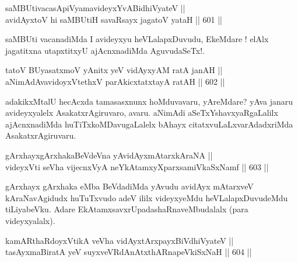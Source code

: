 
\begin{shl}
saMBUtivacasA\s piVyamavideyxYvABidhiVyateV ||  \\
avidAyxtoV hi saMBUtiH savaRsayx jagatoV yataH \hfill || 601 ||  
\end{shl}

\begin{artha}
saMBUti vacanadiMda I avideyxyu heVLalapxDuvudu, EkeMdare !
elAlx jagatitxna utapxtitxyU ajAcnxnadiMda AguvudaSeTx!.
\end{artha}


\begin{shl}
tatoV BUyasatxmoV yAnitx yeV vidAyxyAM ratA janAH || \\
aNimAdAvavidoyxVtethxV parAkicxtatxtayA ratAH \hfill || 602 ||  
\end{shl}

\begin{artha}
adakikxMtalU hecAcxda tamasasxnunx hoMduvavaru, yAreMdare? yAva janaru avideyxyalelx AsakatxrAgiruvaro, avaru. aNimAdi aSeTxYshavxyaRgaLalilx ajAcnxnadiMda huTiTxkoMDavugaLalelx bAhayx citatxvuLaLxvarAdadxriMda AsakatxrAgiruvaru.
\end{artha}


\begin{shl}
gArxhayxgArxhakaBeVdeVna yA\s vidAyxmAtarxkAraNA || \\
videyxVti seVha vijecnxVyA neYkAtamxyXparxsamiVkaSxNamf ||  603  ||  
\end{shl}

\begin{artha}
gArxhayx gArxhaka eMba BeVdadiMda yAvudu avidAyx mAtarxveV
kAraNavAgidudx huTuTxvudo adeV ililx videyxyeMdu heVLalapxDuvudeMdu
tiLiyabeVku. Adare EkAtamxsavxrUpadashaRnaveMbudalalx (para
videyxyalalx).
\end{artha}


\begin{shl}
kamARthaRdoyxVtikA veVha vidAyx\s tArxpayxBiVdhiVyateV || \\
tasAyxmaBiratA yeV suyxveVRdAnAtxthARnapeVkiSxNaH \hfill || 604 ||  
\end{shl}


